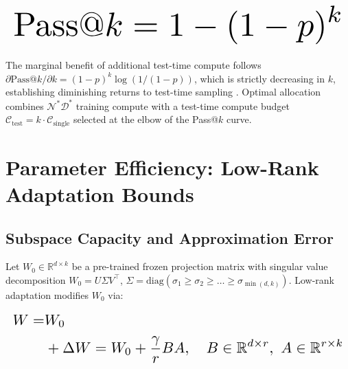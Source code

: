 \documentclass{article}
\begin{document}
\begin{equation}
\resizebox{\columnwidth}{!}{$\displaystyle
\begin{aligned}
\text{Pass@}k = 1 - (1-p)^k
\end{aligned}
$}
\end{equation}















The marginal benefit of additional test-time compute follows $\partial\text{Pass@}k/\partial k = (1-p)^k \log(1/(1-p))$, which is strictly decreasing in $k$, establishing diminishing returns to test-time sampling \cite{arxiv_2203_11171}. Optimal allocation combines $\mathcal{N}^*\mathcal{D}^*$ training compute with a test-time compute budget $\mathcal{C}_{\text{test}} = k \cdot \mathcal{C}_{\text{single}}$ selected at the elbow of the Pass@$k$ curve.




\section{Parameter Efficiency: Low-Rank Adaptation Bounds}



\subsection{Subspace Capacity and Approximation Error}


Let $W_0 \in \mathbb{R}^{d \times k}$ be a pre-trained frozen projection matrix with singular value decomposition $W_0 = U\Sigma V^\top$, $\Sigma = \text{diag}(\sigma_1 \geq \sigma_2 \geq \ldots \geq \sigma_{\min(d,k)})$. Low-rank adaptation modifies $W_0$ via:















\begin{equation}
\resizebox{\columnwidth}{!}{$\displaystyle
\begin{aligned}
W = & W_0 \\
& + \Delta W = W_0 + \frac{\gamma}{r}BA, \quad B \in \mathbb{R}^{d \times r},\ A \in \mathbb{R}^{r \times k}
\end{aligned}
$}
\end{equation}
\end{document}
